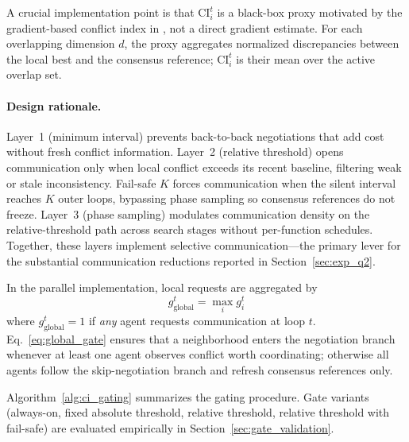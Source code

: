 \documentclass[conference]{IEEEtran}
\begin{document}
A crucial implementation point is that $\mathrm{CI}_i^t$ is a black-box proxy motivated by the gradient-based conflict index in \cite{ref_macpo}, not a direct gradient estimate. For each overlapping dimension $d$, the proxy aggregates normalized discrepancies between the local best and the consensus reference; $\mathrm{CI}_i^t$ is their mean over the active overlap set.

\paragraph{Design rationale.} Layer~1 (minimum interval) prevents back-to-back negotiations that add cost without fresh conflict information. Layer~2 (relative threshold) opens communication only when local conflict exceeds its recent baseline, filtering weak or stale inconsistency. Fail-safe $K$ forces communication when the silent interval reaches $K$ outer loops, bypassing phase sampling so consensus references do not freeze. Layer~3 (phase sampling) modulates communication density on the relative-threshold path across search stages without per-function schedules. Together, these layers implement selective communication---the primary lever for the substantial communication reductions reported in Section~\ref{sec:exp_q2}.

In the parallel implementation, local requests are aggregated by
\begin{equation}
g_{\mathrm{global}}^t=\max_i g_i^t
\label{eq:global_gate}
\end{equation}
where $g_{\mathrm{global}}^t=1$ if \emph{any} agent requests communication at loop $t$. Eq.~\eqref{eq:global_gate} ensures that a neighborhood enters the negotiation branch whenever at least one agent observes conflict worth coordinating; otherwise all agents follow the skip-negotiation branch and refresh consensus references only.

Algorithm~\ref{alg:ci_gating} summarizes the gating procedure. Gate variants (always-on, fixed absolute threshold, relative threshold, relative threshold with fail-safe) are evaluated empirically in Section~\ref{sec:gate_validation}.
\end{document}
